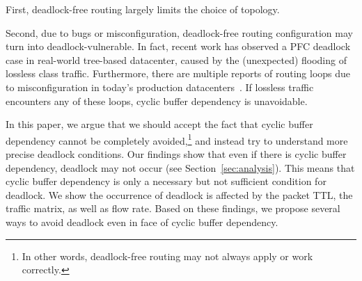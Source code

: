 First, deadlock-free routing largely limits the choice of topology. 

Second, due to bugs or misconfiguration, deadlock-free routing configuration may
turn into deadlock-vulnerable. In fact, recent work has observed a PFC deadlock
case in real-world tree-based datacenter\cite{rdmascale}, caused by the
(unexpected) flooding of lossless class traffic.  Furthermore, there are multiple
reports of routing loops due to misconfiguration in today's production
datacenters~\cite{everflow, libra}. If lossless traffic encounters any of these
loops, cyclic buffer dependency is unavoidable.

In this paper, we argue that we should accept the fact that cyclic buffer
dependency cannot be completely avoided,\footnote{In other words, deadlock-free
routing may not always apply or work correctly.} and instead try to
understand more precise deadlock conditions.  Our findings show that even if
there is cyclic buffer dependency, deadlock may not occur (see
Section~\ref{sec:analysis}).  This means that cyclic buffer dependency is only a
necessary but not sufficient condition for deadlock.  We show the occurrence of
deadlock is affected by the packet TTL, the traffic matrix, as well as flow
rate. Based on these findings, we propose several ways to avoid deadlock even in
face of cyclic buffer dependency.


